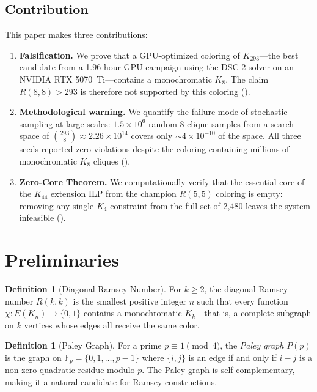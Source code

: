 \documentclass[12pt,a4paper]{article}
\theoremstyle{definition}
\newtheorem{definition}[theorem]{Definition}
\theoremstyle{remark}
\newcommand{\Ramsey}[2]{R(#1,#2)}
\newcommand{\Kn}[1]{K_{#1}}
\begin{document}
\subsection{Contribution}

This paper makes three contributions:

\begin{enumerate}[label=(\roman*)]
\item \textbf{Falsification.}  We prove that a GPU-optimized coloring of $\Kn{293}$---the best candidate from a 1.96-hour GPU campaign using the DSC-2 solver on an NVIDIA RTX 5070~Ti---contains a monochromatic $K_8$.  The claim $\Ramsey{8}{8} > 293$ is therefore not supported by this coloring ().

\item \textbf{Methodological warning.}  We quantify the failure mode of stochastic sampling at large scales: $1.5 \times 10^6$ random $8$-clique samples from a search space of $\binom{293}{8} \approx 2.26 \times 10^{14}$ covers only $\sim\! 4 \times 10^{-10}$ of the space.  All three seeds reported zero violations despite the coloring containing millions of monochromatic $K_8$ cliques ().

\item \textbf{Zero-Core Theorem.}  We computationally verify that the essential core of the $\Kn{44}$ extension ILP from the champion $R(5,5)$ coloring is empty: removing any single $K_4$ constraint from the full set of 2,480 leaves the system infeasible ().
\end{enumerate}

\section{Preliminaries}
\label{sec:prelim}

\begin{definition}[Diagonal Ramsey Number]
\label{def:ramsey}
For $k \ge 2$, the diagonal Ramsey number $\Ramsey{k}{k}$ is the smallest positive integer $n$ such that every function $\chi: E(\Kn{n}) \to \{0, 1\}$ contains a monochromatic $K_k$---that is, a complete subgraph on $k$ vertices whose edges all receive the same color.
\end{definition}

\begin{definition}[Paley Graph]
\label{def:paley}
For a prime $p \equiv 1 \pmod{4}$, the \emph{Paley graph} $P(p)$ is the graph on $\mathbb{F}_p = \{0, 1, \ldots, p-1\}$ where $\{i, j\}$ is an edge if and only if $i - j$ is a non-zero quadratic residue modulo $p$.  The Paley graph is self-complementary, making it a natural candidate for Ramsey constructions.
\end{definition}
\end{document}
